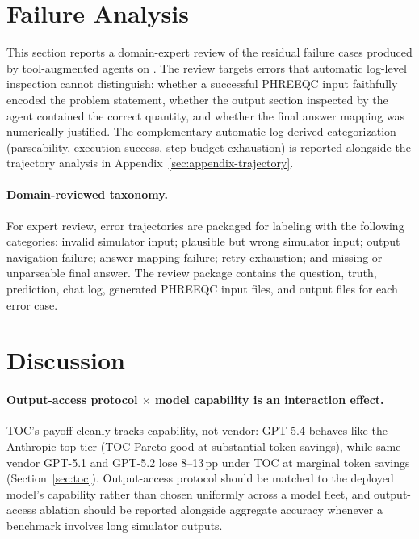 \documentclass{article}
\begin{document}
\section{Failure Analysis}
\label{sec:failure}

This section reports a domain-expert review of the residual failure cases produced by tool-augmented agents on \BenchName. The review targets errors that automatic log-level inspection cannot distinguish: whether a successful PHREEQC input faithfully encoded the problem statement, whether the output section inspected by the agent contained the correct quantity, and whether the final answer mapping was numerically justified. The complementary automatic log-derived categorization (parseability, execution success, step-budget exhaustion) is reported alongside the trajectory analysis in Appendix~\ref{sec:appendix-trajectory}.

\paragraph{Domain-reviewed taxonomy.}
For expert review, error trajectories are packaged for labeling with the following categories: invalid simulator input; plausible but wrong simulator input; output navigation failure; answer mapping failure; retry exhaustion; and missing or unparseable final answer. The review package contains the question, truth, prediction, chat log, generated PHREEQC input files, and output files for each error case.

\section{Discussion}

\paragraph{Output-access protocol $\times$ model capability is an interaction effect.}
TOC's payoff cleanly tracks capability, not vendor: GPT-5.4 behaves like the Anthropic top-tier (TOC Pareto-good at substantial token savings), while same-vendor GPT-5.1 and GPT-5.2 lose 8--13\,pp under TOC at marginal token savings (Section~\ref{sec:toc}). Output-access protocol should be matched to the deployed model's capability rather than chosen uniformly across a model fleet, and output-access ablation should be reported alongside aggregate accuracy whenever a benchmark involves long simulator outputs.
\end{document}
